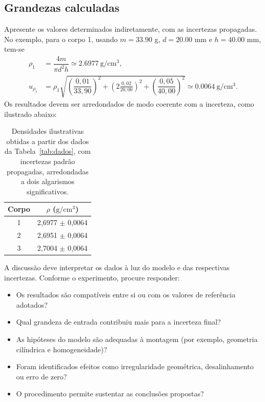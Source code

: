 \documentclass[aps,prb,12pt,onecolumn,amsmath,amssymb]{revtex4-2}
\begin{document}
\subsection{Grandezas calculadas}
Apresente os valores determinados indiretamente, com as incertezas propagadas. No exemplo, para o corpo 1, usando $m = \num{33,90}$ g, $d = \num{20,00}$ mm e $h = \num{40,00}$ mm, tem-se
\begin{align}
    \rho_1 &= \dfrac{4m}{\pi d^2h} \simeq \SI{2,6977}{\gram\per\centi\meter\cubed}, \\
    u_{\rho_1} &= \rho_1\sqrt{\left(\dfrac{0,01}{33,90}\right)^2 + \left(2\frac{0,02}{20,00}\right)^2 + \left(\dfrac{0,05}{40,00}\right)^2}
    \simeq \SI{0,0064}{\gram\per\centi\meter\cubed}.
\end{align}
Os resultados devem ser arredondados de modo coerente com a incerteza, como ilustrado abaixo:
\begin{table}[ht]
    \centering
    \begin{tabular}{cc}
        \toprule
        Corpo & $\rho$ ($\mathrm{g/cm^3}$) \\
        \midrule
        1 & 2,6977 $\pm$ 0,0064 \\
        2 & 2,6951 $\pm$ 0,0064 \\
        3 & 2,7004 $\pm$ 0,0064 \\
        \bottomrule
    \end{tabular}
    \caption{Densidades ilustrativas obtidas a partir dos dados da Tabela~\ref{tab:dados}, com incertezas padrão propagadas, arredondadas a dois algarismos significativos.}
    \label{tab:resultados}
\end{table}

A discussão deve interpretar os dados à luz do modelo e das respectivas incertezas. Conforme o experimento, procure responder:
\begin{itemize}
    \item Os resultados são compatíveis entre si ou com os valores de referência adotados?
    \item Qual grandeza de entrada contribuiu mais para a incerteza final?
    \item As hipóteses do modelo são adequadas à montagem (por exemplo, geometria cilíndrica e homogeneidade)?
    \item Foram identificados efeitos como irregularidade geométrica, desalinhamento ou erro de zero?
    \item O procedimento permite sustentar as conclusões propostas?
\end{itemize}
\end{document}
